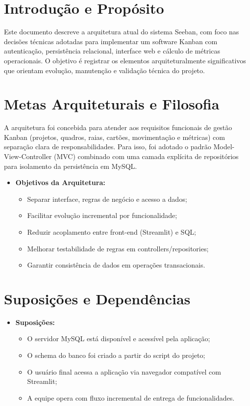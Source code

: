 \section{Introdução e Propósito}
Este documento descreve a arquitetura atual do sistema Seeban, com foco nas decisões técnicas adotadas para implementar um software Kanban com autenticação, persistência relacional, interface web e cálculo de métricas operacionais.
O objetivo é registrar os elementos arquiteturalmente significativos que orientam evolução, manutenção e validação técnica do projeto.

\section{Metas Arquiteturais e Filosofia}
A arquitetura foi concebida para atender aos requisitos funcionais de gestão Kanban (projetos, quadros, raias, cartões, movimentação e métricas) com separação clara de responsabilidades.
Para isso, foi adotado o padrão Model-View-Controller (MVC) combinado com uma camada explícita de repositórios para isolamento da persistência em MySQL.

\begin{itemize}
    \item \textbf{Objetivos da Arquitetura:}
    \begin{itemize}
        \item Separar interface, regras de negócio e acesso a dados;
        \item Facilitar evolução incremental por funcionalidade;
        \item Reduzir acoplamento entre front-end (Streamlit) e SQL;
        \item Melhorar testabilidade de regras em controllers/repositories;
        \item Garantir consistência de dados em operações transacionais.
    \end{itemize}
\end{itemize}

\section{Suposições e Dependências}
\begin{itemize}
    \item \textbf{Suposições:}
    \begin{itemize}
        \item O servidor MySQL está disponível e acessível pela aplicação;
        \item O schema do banco foi criado a partir do script do projeto;
        \item O usuário final acessa a aplicação via navegador compatível com Streamlit;
        \item A equipe opera com fluxo incremental de entrega de funcionalidades.
    \end{itemize}
\end{itemize}

